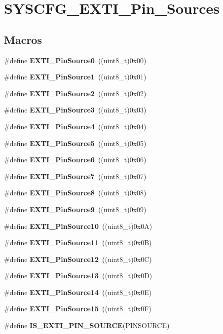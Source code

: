 \section{S\+Y\+S\+C\+F\+G\+\_\+\+E\+X\+T\+I\+\_\+\+Pin\+\_\+\+Sources}
\label{group__SYSCFG__EXTI__Pin__Sources}
\subsection*{Macros}
\begin{DoxyCompactItemize}
\item 
\#define \textbf{ E\+X\+T\+I\+\_\+\+Pin\+Source0}~((uint8\+\_\+t)0x00)
\item 
\#define \textbf{ E\+X\+T\+I\+\_\+\+Pin\+Source1}~((uint8\+\_\+t)0x01)
\item 
\#define \textbf{ E\+X\+T\+I\+\_\+\+Pin\+Source2}~((uint8\+\_\+t)0x02)
\item 
\#define \textbf{ E\+X\+T\+I\+\_\+\+Pin\+Source3}~((uint8\+\_\+t)0x03)
\item 
\#define \textbf{ E\+X\+T\+I\+\_\+\+Pin\+Source4}~((uint8\+\_\+t)0x04)
\item 
\#define \textbf{ E\+X\+T\+I\+\_\+\+Pin\+Source5}~((uint8\+\_\+t)0x05)
\item 
\#define \textbf{ E\+X\+T\+I\+\_\+\+Pin\+Source6}~((uint8\+\_\+t)0x06)
\item 
\#define \textbf{ E\+X\+T\+I\+\_\+\+Pin\+Source7}~((uint8\+\_\+t)0x07)
\item 
\#define \textbf{ E\+X\+T\+I\+\_\+\+Pin\+Source8}~((uint8\+\_\+t)0x08)
\item 
\#define \textbf{ E\+X\+T\+I\+\_\+\+Pin\+Source9}~((uint8\+\_\+t)0x09)
\item 
\#define \textbf{ E\+X\+T\+I\+\_\+\+Pin\+Source10}~((uint8\+\_\+t)0x0\+A)
\item 
\#define \textbf{ E\+X\+T\+I\+\_\+\+Pin\+Source11}~((uint8\+\_\+t)0x0\+B)
\item 
\#define \textbf{ E\+X\+T\+I\+\_\+\+Pin\+Source12}~((uint8\+\_\+t)0x0\+C)
\item 
\#define \textbf{ E\+X\+T\+I\+\_\+\+Pin\+Source13}~((uint8\+\_\+t)0x0\+D)
\item 
\#define \textbf{ E\+X\+T\+I\+\_\+\+Pin\+Source14}~((uint8\+\_\+t)0x0\+E)
\item 
\#define \textbf{ E\+X\+T\+I\+\_\+\+Pin\+Source15}~((uint8\+\_\+t)0x0\+F)
\item 
\#define \textbf{ I\+S\+\_\+\+E\+X\+T\+I\+\_\+\+P\+I\+N\+\_\+\+S\+O\+U\+R\+CE}(P\+I\+N\+S\+O\+U\+R\+CE)
\end{DoxyCompactItemize}


